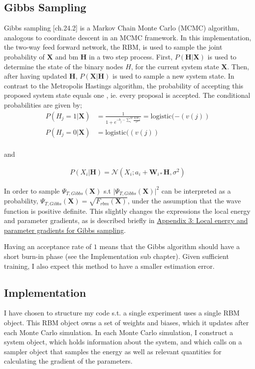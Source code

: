 \documentclass[%
oneside,                 %
final,                   %
10pt]{article}
\begin{document}
\subsection{Gibbs Sampling}
Gibbs sampling \cite{MLMurphy}[ch.24.2] is a Markov Chain Monte Carlo (MCMC) algorithm, analogous to coordinate descent in an MCMC framework. In this implementation, the two-way feed forward network, the RBM, is used to sample the joint probability of $\bm X$ and bm $\bm H$ in a two step process. First, $P(\bm H|\bm X)$ is used to determine the state of the binary nodes $ H$, for the current system state $\bm X$. Then, after having updated $\bm H$, $P(\bm X|\bm H)$ is used to sample a new system state. In contrast to the Metropolis Hastings algorithm, the probability of accepting this proposed system state equals one \cite{Flugsrud}, ie. every proposal is accepted. The conditional probabilities are given by;
\begin{equation}
\begin{aligned}
P(H_j=1|\bm X) & = \frac{1}{1+e^{-b_j-\sum_i^M \frac{X_i W_{ij}}{\sigma^2}}}=\text{logistic} (-(v(j)) \\
P(H_j=0|\bm X) & =\text{logistic} ((v(j)) \\
\end{aligned}
\label{eq:gibbs_prob_h}
\end{equation}

and

\begin{equation}
\begin{aligned}
P(X_i|\bm H) = \mathcal{N} (X_i;a_i+\bm W_{i*}\bm H,\sigma^2) 
\end{aligned}
\label{eq:gibbs_prob_x}
\end{equation}

In order to sample $\Psi_{T,Gibbs}(\bm X)$ s.t $\vert \Psi_{T,Gibbs}(\bm X) \vert^2$ can be interpreted as a probability, $\Psi_{T,Gibbs}(\bm X)=\sqrt{F_{rbm}(\bm X)}$, under the assumption that the wave function is positive definite. This slightly changes the expressions the local energy and parameter gradients, as is described briefly in \hyperref[APP_3]{Appendix 3: Local energy and parameter gradients for Gibbs sampling}. 

Having an acceptance rate of $1$ means that the Gibbs algorithm should have a short burn-in phase (see the Implementation sub chapter). Given sufficient training, I also expect this method to have a smaller estimation error. 

\subsection{Implementation} 
I have chosen to structure my code s.t. a single experiment uses a single RBM object. This RBM object owns a set of weights and biases, which it updates after each Monte Carlo simulation. In each Monte Carlo simulation, I construct a system object, which holds information about the system, and which calls on a sampler object that samples the energy as well as relevant quantities for calculating the gradient of the parameters. 
\end{document}

